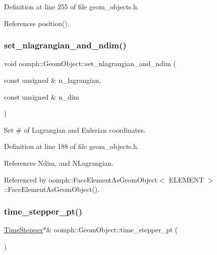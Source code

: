 Definition at line 255 of file geom\+\_\+objects.\+h.



References position().

\mbox{\label{classoomph_1_1GeomObject_a375ecd197d0aff695825ad33a35e0d7e}} 
\subsubsection{\texorpdfstring{set\+\_\+nlagrangian\+\_\+and\+\_\+ndim()}{set\_nlagrangian\_and\_ndim()}}
{\footnotesize\ttfamily void oomph\+::\+Geom\+Object\+::set\+\_\+nlagrangian\+\_\+and\+\_\+ndim (\begin{DoxyParamCaption}\item[{const unsigned \&}]{n\+\_\+lagrangian,  }\item[{const unsigned \&}]{n\+\_\+dim }\end{DoxyParamCaption})\hspace{0.3cm}{\ttfamily [inline]}}



Set \# of Lagrangian and Eulerian coordinates. 



Definition at line 188 of file geom\+\_\+objects.\+h.



References Ndim, and N\+Lagrangian.



Referenced by oomph\+::\+Face\+Element\+As\+Geom\+Object$<$ E\+L\+E\+M\+E\+N\+T $>$\+::\+Face\+Element\+As\+Geom\+Object().

\mbox{\label{classoomph_1_1GeomObject_a3c92023891dd4a0e818022f467eeb7f1}} 
\subsubsection{\texorpdfstring{time\+\_\+stepper\+\_\+pt()}{time\_stepper\_pt()}\hspace{0.1cm}{\footnotesize\ttfamily [1/2]}}
{\footnotesize\ttfamily \hyperlink{classoomph_1_1TimeStepper}{Time\+Stepper}$\ast$\& oomph\+::\+Geom\+Object\+::time\+\_\+stepper\+\_\+pt (\begin{DoxyParamCaption}{ }\end{DoxyParamCaption})\hspace{0.3cm}{\ttfamily [inline]}}



